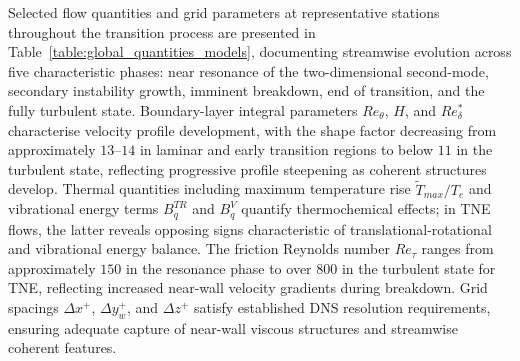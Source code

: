 
Selected flow quantities and grid parameters at representative stations throughout the transition process are presented in Table~\ref{table:global_quantities_models}, documenting streamwise evolution across five characteristic phases: near resonance of the two-dimensional second-mode, secondary instability growth, imminent breakdown, end of transition, and the fully turbulent state. Boundary-layer integral parameters $Re_\theta$, $H$, and $Re^*_\delta$ characterise velocity profile development, with the shape factor decreasing from approximately $13$--$14$ in laminar and early transition regions to below $11$ in the turbulent state, reflecting progressive profile steepening as coherent structures develop. Thermal quantities including maximum temperature rise $\tilde{T}_{max}/T_e$ and vibrational energy terms $B_q^{TR}$ and $B_q^{V}$ quantify thermochemical effects; in \gls{TNE} flows, the latter reveals opposing signs characteristic of translational-rotational and vibrational energy balance. The friction Reynolds number $Re_\tau$ ranges from approximately $150$ in the resonance phase to over $800$ in the turbulent state for \gls{TNE}, reflecting increased near-wall velocity gradients during breakdown. Grid spacings $\Delta x^+$, $\Delta y_w^+$, and $\Delta z^+$ satisfy established \gls{DNS} resolution requirements, ensuring adequate capture of near-wall viscous structures and streamwise coherent features.

